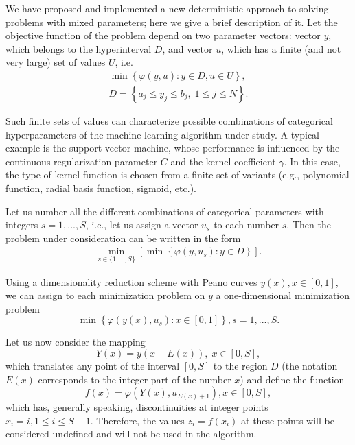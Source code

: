 \documentclass[preprint,12pt]{elsarticle}
\begin{document}
We have proposed and implemented a new deterministic approach to solving problems with mixed parameters; here we give a brief description of it. 
Let the objective function of the problem depend on two parameter vectors: vector $y$, which belongs to the hyperinterval $D$, and vector $u$, which has a finite (and not very large) set of values $U$, i.e.
\begin{gather}\label{problem_i}
\min{\left\{ \varphi(y,u) : y\in D, u \in U \right\}},\\
D=\left\{a_j \leq y_j \leq b_j, \; 1\leq j \leq N \right\}.\nonumber
\end{gather}

Such finite sets of values can characterize possible combinations of categorical hyperparameters of the machine learning algorithm under study. A typical example is the support vector machine, whose performance is influenced by the continuous regularization parameter $C$ and the kernel coefficient $\gamma$. In this case, the type of kernel function is chosen from a finite set of variants (e.g., polynomial function, radial basis function, sigmoid, etc.). 

Let us number all the different combinations of categorical parameters with integers $s = 1,...,S$, i.e., let us assign a vector $u_s$ to each number $s$. Then the problem under consideration can be written in the form
\begin{gather}\label{problem_is}
 \min_{s\in\{1,...,S\}}\left[\min{\left\{ \varphi(y,u_s) : y\in D \right\}}\right].
\end{gather}

Using a dimensionality reduction scheme with Peano curves $y(x), x\in [0,1]$,  we can assign to each minimization problem on $y$ a one-dimensional minimization problem
\begin{equation}\label{fi_s}
 \min{\left\{ \varphi(y(x),u_s): x \in [0,1] \right\}}, s = 1,...,S.
\end{equation}

Let us now consider the mapping
\[
Y(x)=y(x-E(x)), \; x\in[0,S],
\]
which translates any point of the interval $[0,S]$ to the region $D$ (the notation $E(x)$ corresponds to the integer part of the number $x$) and define the function
\begin{equation}\label{f}
f(x) = \varphi(Y(x),u_{E(x)+1}), x\in[0,S],
\end{equation}
which has, generally speaking, discontinuities at integer points $x_i = i, 1 \leq i \leq S-1$.
Therefore, the values $z_i = f(x_i)$ at these points will be considered undefined and will not be used in the algorithm.
\end{document}
